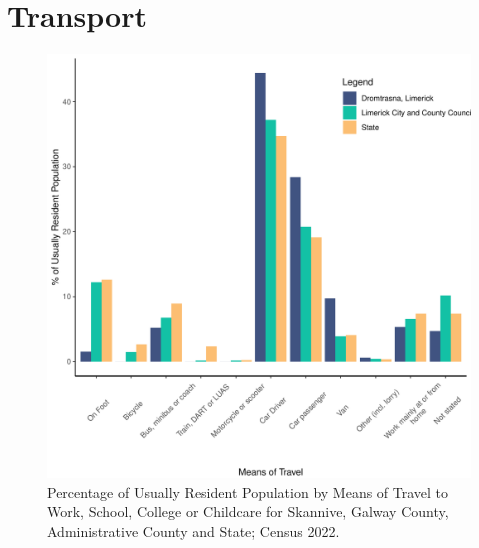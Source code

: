 \documentclass{article}
\begin{document}
\section{Transport}\label{sect:Trans}
\begin{figure}[H]
	\centering
	\includegraphics[width = 120mm]{../figures/TravelED.pdf}
	\caption{Percentage of Usually Resident Population by Means of Travel to Work, School, College or Childcare for Skannive, Galway County, Administrative County and State; Census 2022.}
	\label{fig:vbnv}
	\end{figure}
\end{document}
